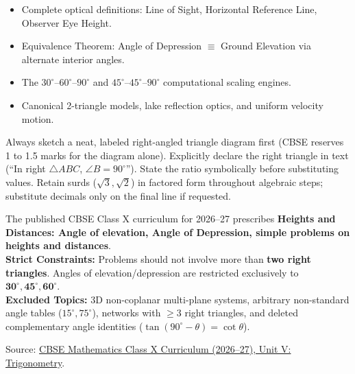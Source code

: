 \documentclass[10pt,a4paper]{article}
\begin{document}
\vspace{2.5mm}
\begin{minipage}[t]{0.485\textwidth}
  \begin{conceptBox}[title=What this handbook includes,fonttitle=\bfseries\color{navy}]
    \begin{itemize}
      \item Complete optical definitions: Line of Sight, Horizontal Reference Line, Observer Eye Height.
      \item Equivalence Theorem: Angle of Depression $\equiv$ Ground Elevation via alternate interior angles.
      \item The $30^\circ$--$60^\circ$--$90^\circ$ and $45^\circ$--$45^\circ$--$90^\circ$ computational scaling engines.
      \item Canonical 2-triangle models, lake reflection optics, and uniform velocity motion.
    \end{itemize}
  \end{conceptBox}
\end{minipage}\hfill
\begin{minipage}[t]{0.485\textwidth}
  \begin{formulaBox}[title=How to use it for maximum marks,fonttitle=\bfseries\color{navy}]
    \raggedright Always sketch a neat, labeled right-angled triangle diagram first (CBSE reserves 1 to 1.5 marks for the diagram alone). Explicitly declare the right triangle in text (``In right $\triangle ABC$, $\angle B = 90^\circ$''). State the ratio symbolically before substituting values. Retain surds ($\sqrt{3}, \sqrt{2}$) in factored form throughout algebraic steps; substitute decimals only on the final line if requested.
  \end{formulaBox}
\end{minipage}

\vspace{1.5mm}
\begin{warningBox}[title=Official syllabus scope (CBSE Class X 2026--27),fonttitle=\bfseries\color{navy}]
  The published CBSE Class X curriculum for 2026--27 prescribes \textbf{Heights and Distances: Angle of elevation, Angle of Depression, simple problems on heights and distances}. \\
  \textbf{Strict Constraints:} Problems should not involve more than \textbf{two right triangles}. Angles of elevation/depression are restricted exclusively to $\mathbf{30^\circ, 45^\circ, 60^\circ}$. \\
  \textbf{Excluded Topics:} 3D non-coplanar multi-plane systems, arbitrary non-standard angle tables ($15^\circ, 75^\circ$), networks with $\ge 3$ right triangles, and deleted complementary angle identities ($\tan(90^\circ-\theta)=\cot\theta$).\par
  {\scriptsize Source: \href{https://cbseacademic.nic.in/web_material/CurriculumMain27/SecPart1/Maths_SecP1X_2026-27.pdf}{CBSE Mathematics Class X Curriculum (2026--27), Unit V: Trigonometry}.}
\end{warningBox}
\end{document}
